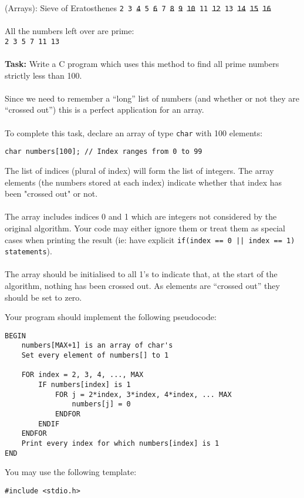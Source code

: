 \documentclass{lab}
\begin{document}
\begin{task}{(Arrays): Sieve of Eratosthenes}{}
\texttt{2 3 \st{4} 5 \st{6} 7 \st{8} \st{9} \st{10} 11 \st{12} 13 \st{14} \st{15} \st{16}}
\\~\\
All the numbers left over are prime:\\
\texttt{2 3 5 7 11 13}
\\~\\
\textbf{Task:} Write a C program which uses this method to find all prime numbers strictly less than 100.
\\~\\
Since we need to remember a ``long'' list of numbers (and whether or not they are ``crossed out'') this is a perfect application for an array.
\\~\\
To complete this task, declare an array of type \texttt{char} with 100 elements:
\begin{lstlisting}[style=Ctable]
char numbers[100]; // Index ranges from 0 to 99
\end{lstlisting}
The list of indices (plural of index) will form the list of integers. The array elements (the numbers stored at each index) indicate whether that index has been "crossed out" or not.
\\~\\
The array includes indices 0 and 1 which are integers not considered by the original algorithm. Your code may either ignore them or treat them as special cases when printing the result (ie: have explicit \texttt{if(index == 0 || index == 1) statements}).
\\~\\
The array should be initialised to all 1's to indicate that, at the start of the algorithm, nothing has been crossed out. As elements are ``crossed out'' they should be set to zero.

\pagebreak
Your program should implement the following pseudocode:
\begin{lstlisting}[style=pseudo]
BEGIN
	numbers[MAX+1] is an array of char's
	Set every element of numbers[] to 1
	
	FOR index = 2, 3, 4, ..., MAX
		IF numbers[index] is 1
			FOR j = 2*index, 3*index, 4*index, ... MAX
				numbers[j] = 0
			ENDFOR
		ENDIF
	ENDFOR
	Print every index for which numbers[index] is 1
END
\end{lstlisting}

You may use the following template:
\begin{lstlisting}[style=Ctable]
#include <stdio.h>


\end{lstlisting}
\end{task}
\end{document}

